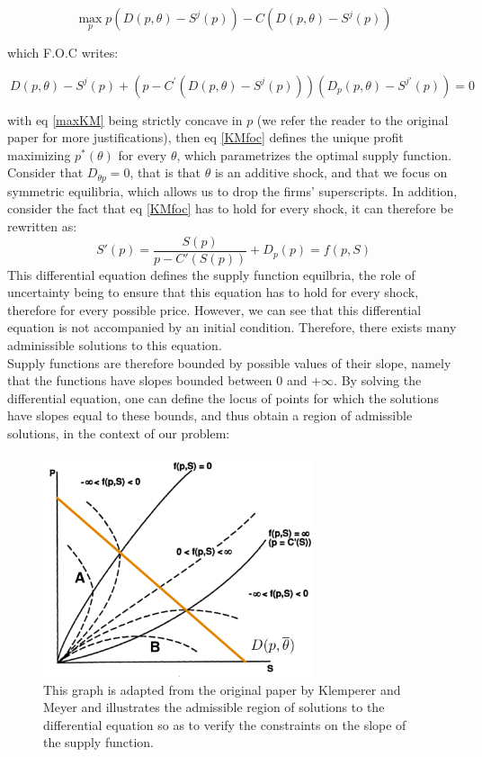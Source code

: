 \begin{equation}\label{maxKM}
\max_p p\left( D(p,\theta) - S^j(p)\right) - C\left( D(p,\theta) - S^j(p)\right) 
\end{equation}

which F.O.C writes:

\begin{equation}\label{KMfoc}
\ D(p,\theta) - S^j(p) + \left( p - C^\prime\left( D(p,\theta) - S^j(p)\right)    \right)\left(  D_p(p,\theta)   - S^{j\prime}(p)\right) = 0
\end{equation}

with eq \ref{maxKM} being strictly concave in $p$ (we refer the reader to the original paper for more justifications), then eq \ref{KMfoc} defines the unique profit maximizing $p^*(\theta)$ for every $\theta$, which parametrizes the optimal supply function. \\

Consider that $D_{\theta p }=0$, that is that $\theta$ is an additive shock, and that we focus on symmetric equilibria, which allows us to drop the firms' superscripts. In addition, consider the fact that eq \ref{KMfoc} has to hold for every shock, it can therefore be rewritten as:
\begin{equation}\label{KMdiff}
S'(p) = \frac{S(p)}{p-C'(S(p))} + D_p(p)= f(p,S)
\end{equation}
This differential equation defines the supply function equilbria, the role of uncertainty being to ensure that this equation has to hold for every shock, therefore for every possible price. However, we can see that this differential equation is not accompanied by an initial condition. Therefore, there exists many adminissible solutions to this equation.\\

Supply functions are therefore bounded by possible values of their slope, namely that the functions have slopes bounded between $0$ and $+\infty$. By solving the differential equation, one can define the locus of points for which the solutions have slopes equal to these bounds, and thus obtain a region of admissible solutions, in the context of our problem:

\begin{figure}[h]
\centering
\includegraphics[width=8cm]{figintro/KMboundaries.png}
\caption{\small{This graph is adapted from the original paper by Klemperer and Meyer and illustrates the admissible region of solutions to the differential equation so as to verify the constraints on the slope of the supply function.}}
\label{KMboundaries}
\end{figure}

